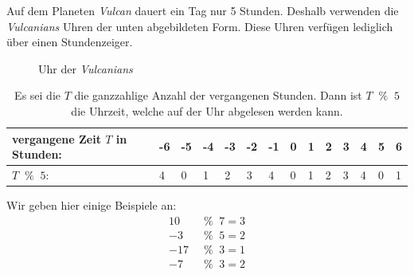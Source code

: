 \begin{myexample}\label{myexample:clock}
Auf dem Planeten \textit{Vulcan} dauert ein Tag nur 5 Stunden. Deshalb verwenden die \textit{Vulcanians} Uhren der unten abgebildeten Form. Diese Uhren verfügen lediglich über einen Stundenzeiger.
\begin{figure}[H]
	\centering
	\caption{Uhr der \textit{Vulcanians}}
\end{figure}

\begin{table}[H]
	\begin{tabular}{|l|l|l|l|l|l|l|l|l|l|l|l|l|l|}
		\hline
		{\color[HTML]{FE0000} vergangene Zeit $T$ in Stunden:} & {\color[HTML]{FE0000} -6} & {\color[HTML]{FE0000} -5} & {\color[HTML]{FE0000} -4} & {\color[HTML]{FE0000} -3} & {\color[HTML]{FE0000} -2} & {\color[HTML]{FE0000} -1} & {\color[HTML]{FE0000} 0} & {\color[HTML]{FE0000} 1} & {\color[HTML]{FE0000} 2} & {\color[HTML]{FE0000} 3} & {\color[HTML]{FE0000} 4} & {\color[HTML]{FE0000} 5} & {\color[HTML]{FE0000} 6} \\ \hline
		{\color[HTML]{3531FF} $T\; \;\%\; \; 5$:}              & {\color[HTML]{3531FF} 4}  & {\color[HTML]{3531FF} 0}  & {\color[HTML]{3531FF} 1}  & {\color[HTML]{3531FF} 2}  & {\color[HTML]{3531FF} 3}  & {\color[HTML]{3531FF} 4}  & {\color[HTML]{3531FF} 0} & {\color[HTML]{3531FF} 1} & {\color[HTML]{3531FF} 2} & {\color[HTML]{3531FF} 3} & {\color[HTML]{3531FF} 4} & {\color[HTML]{3531FF} 0} & {\color[HTML]{3531FF} 1} \\ \hline
	\end{tabular}
	\caption{Es sei die $T$ die ganzzahlige Anzahl der vergangenen Stunden. Dann ist $T\; \;\%\; \; 5$ die Uhrzeit, welche auf der Uhr abgelesen werden kann.}
\end{table}
\end{myexample}

\begin{myexample}
Wir geben hier einige Beispiele an:
\begin{align*}
	10 \; & \;\%\; \; 7 = 3 \\
	-3 \; & \;\%\; \; 5 = 2 \\
	-17\; & \;\%\; \; 3 = 1 \\
	-7 \; & \;\%\; \; 3 = 2
\end{align*}
\end{myexample}

